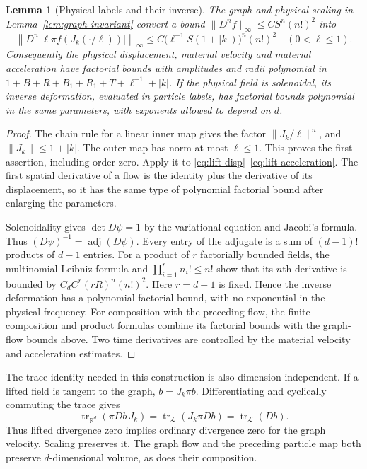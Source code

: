\documentclass[11pt]{article}
\newcommand{\R}{\mathbb R}
\newtheorem{lemma}[theorem]{Lemma}
\theoremstyle{definition}
\begin{document}
\begin{lemma}[Physical labels and their inverse]\label{lem:physical-labels}
The graph and physical scaling in Lemma~\ref{lem:graph-invariant}
convert a bound $\|D^n f\|_\infty\leq C S^n(n!)^2$ into
\[
 \left\|D^n\bigl[\ell\pi f(J_k(\cdot/\ell))\bigr]\right\|_\infty
 \leq C\bigl(\ell^{-1}S(1+|k|)\bigr)^n(n!)^2
 \quad(0<\ell\leq1).
\]
Consequently the physical displacement, material velocity and material
acceleration have factorial bounds with amplitudes and radii polynomial
in $1+B+R+B_1+R_1+T+\ell^{-1}+|k|$. If the physical field is
solenoidal, its inverse deformation, evaluated in particle labels, has
factorial bounds polynomial in
the same parameters, with exponents allowed to depend on $d$.
\end{lemma}
\begin{proof}
The chain rule for a linear inner map gives the factor
$\|J_k/\ell\|^n$, and $\|J_k\|\leq1+|k|$. The outer map has norm at
most $\ell\leq1$. This proves the first assertion, including order
zero. Apply it to \eqref{eq:lift-disp}--\eqref{eq:lift-acceleration}.
The first spatial derivative of a flow is the identity plus the
derivative of its displacement, so it has the same type of polynomial
factorial bound after enlarging the parameters.

Solenoidality gives $\det D\psi=1$ by the variational equation and
Jacobi's formula. Thus $(D\psi)^{-1}=\operatorname{adj}(D\psi)$.
Every entry of the adjugate is a sum of $(d-1)!$ products of $d-1$
entries. For a product of $r$ factorially bounded fields, the
multinomial Leibniz formula and
$\prod_{i=1}^r n_i!\leq n!$ show that its $n$th derivative is bounded
by $C_d C^r(rR)^n(n!)^2$. Here $r=d-1$ is fixed.
Hence the inverse deformation has a polynomial factorial bound, with
no exponential in the physical frequency. For composition with the preceding flow, the finite composition and
product formulas combine its factorial bounds with the graph-flow bounds
above. Two time derivatives are controlled by the material velocity and
acceleration estimates.
\end{proof}

The trace identity needed in this construction is also
dimension independent. If a lifted field is tangent to the graph,
$b=J_k\pi b$. Differentiating and cyclically commuting the trace gives
\[
 \operatorname{tr}_{\R^d}(\pi Db\,J_k)
   =\operatorname{tr}_{\mathcal L}(J_k\pi Db)
   =\operatorname{tr}_{\mathcal L}(Db).
\]
Thus lifted divergence zero implies ordinary divergence zero for the
graph velocity. Scaling preserves it. The graph flow and the preceding particle map both preserve
$d$-dimensional volume, as does their composition.
\end{document}
